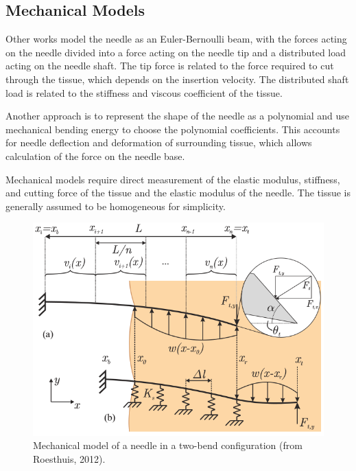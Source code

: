 \subsection{Mechanical Models}
Other works model the needle as an Euler-Bernoulli beam, with the forces acting on the needle divided into a force acting on the needle tip and a distributed load acting on the needle shaft. The tip force is related to the force required to cut through the tissue, which depends on the insertion velocity\cite{barnett_fracture_2015}. The distributed shaft load is related to the stiffness and viscous coefficient of the tissue\cite{abayazid_integrating_2013}.

Another approach is to represent the shape of the needle as a polynomial and use mechanical bending energy to choose the polynomial coefficients\cite{roesthuis_modeling_2015,misra_mechanics_2010,abayazid_integrating_2013}. This accounts for needle deflection and deformation of surrounding tissue, which allows calculation of the force on the needle base.

Mechanical models require direct measurement of the elastic modulus, stiffness, and cutting force of the tissue and the elastic modulus of the needle. The tissue is generally assumed to be homogeneous for simplicity.

\begin{figure}[h]
\includegraphics[width=1.0\textwidth]{Fig/chap2/roesthuis_two_bend_beam.png}
\caption{Mechanical model of a needle in a two-bend configuration (from Roesthuis, 2012\cite{roesthuis_mechanics-based_2012}).}
\label{fig:needle_mech_model}
\end{figure}

